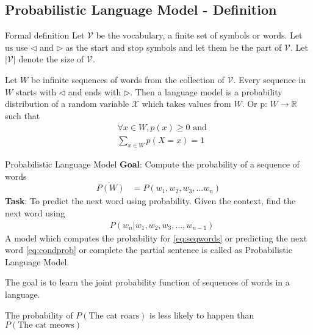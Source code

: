 \subsection{Probabilistic Language Model - Definition}
\begin{frame}{Formal definition}
	Let $\mathcal{V}$ be the vocabulary, a finite set of symbols or words. Let us use $\triangleleft$ and
	$\triangleright$ as the start and stop symbols and let them be the part of $\mathcal{V}$. Let $\left|\mathcal{V}\right|$ denote the size of  $\mathcal{V}$.
	\vspace{0.3cm}

	Let $W$ be infinite sequences of words from the collection of $\mathcal{V}$. Every sequence in $W$ starts with $\triangleleft$ and ends with $\triangleright$. Then a language model is a probability distribution of a random variable $\mathcal{X}$ which takes values from $W$. Or p: $W \rightarrow \mathbb{R}$ such that
	\begin{align}
		&\forall x \in W, p(x) \geq 0 \text{ and}\\
		&\sum_{x\in W}p(X=x) = 1
	\end{align}
\end{frame}

\begin{frame}{Probabilistic Language Model}
	\textbf{Goal}: Compute the probability of a sequence of words
	\begin{align}
		P(W)&= P(w_1,w_2,w_3,...w_n) \label{eq:seqwords}
	\end{align}
	\textbf{Task}: To predict the next word using probability. Given the context, find the next word using
	\begin{align}
		&P(w_n|w_1,w_2,w_3,\ldots,w_{n-1}) \label{eq:condprob}
	\end{align}
	A	model	which computes	the probability	for	\eqref{eq:seqwords} or predicting the next word \eqref{eq:condprob} or complete the partial sentence is called as  Probabilistic Language Model.


	\vspace{0.3cm}
	The  goal is to learn the joint probability function of sequences of words in a language.

	The probability of $P(\text{The cat roars})$ is less likely to happen than $P(\text{The cat meows})$\\
\end{frame}


